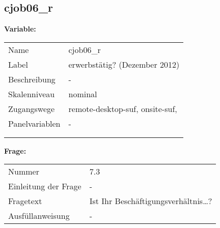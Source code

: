 	
	
	\subsection{cjob06\_r}
	\label{subSection:cjob06_r}

	\noindent\textbf{Variable:}\\
		\begin{tabular}{lL{11.3cm}}
			\label{tableVariable:cjob06_r}
			Name & cjob06\_r \\
			Label & erwerbstätig? (Dezember 2012) \\
			Beschreibung & - \\
			Skalenniveau & nominal \\
			Zugangswege &
				remote-desktop-suf,
				onsite-suf,
 \\
			Panelvariablen & -
			 \\
			 \\
 \\
		\end{tabular}

		\vspace*{1 cm}
		\noindent\textbf{Frage:}\\
		\begin{tabular}{lL{11.3cm}}
			\label{tableQuestion:cjob06_r}
			Nummer & 7.3 \\
			Einleitung der Frage & - \\
			Fragetext & Ist Ihr Beschäftigungsverhältnis…? \\
			Ausfüllanweisung & - \\
		\end{tabular}





	
	\newpage
